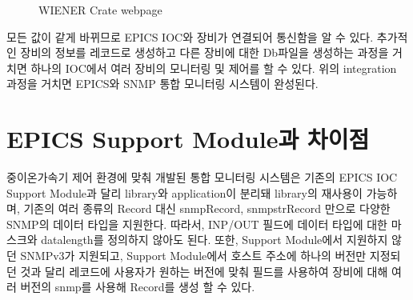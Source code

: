 \documentclass[11pt
  , a4paper
  , article
  , oneside
]{memoir}
\begin{document}
\begin{figure}[!h]
  \centering
              \hfill
              \hfill
  \caption
      {
WIENER Crate webpage
      }
 \label{fig:wienerweb}
\end{figure}

모든 값이 같게 바뀌므로 EPICS IOC와 장비가 연결되어 통신함을 알 수 있다. 추가적인 장비의 정보를 레코드로 생성하고 다른 장비에 대한 Db파일을 생성하는 과정을 거치면 하나의 IOC에서 여러 장비의 모니터링 및 제어를 할 수 있다. 위의 integration 과정을 거치면 EPICS와 SNMP 통합 모니터링 시스템이 완성된다.

\section{EPICS Support Module과 차이점}
중이온가속기 제어 환경에 맞춰 개발된 통합 모니터링 시스템은 기존의 EPICS IOC Support Module과 달리 library와 application이 분리돼 library의 재사용이 가능하며, 기존의 여러 종류의 Record 대신 snmpRecord, snmpstrRecord 만으로 다양한 SNMP의 데이터 타입을 지원한다. 따라서, INP/OUT 필드에 데이터 타입에 대한 마스크와 datalength를 정의하지 않아도 된다. 또한, Support Module에서 지원하지 않던 SNMPv3가 지원되고, Support Module에서 호스트 주소에 하나의 버전만 지정되던 것과 달리 레코드에 사용자가 원하는 버전에 맞춰 필드를 사용하여 장비에 대해 여러 버전의 snmp를 사용해 Record를 생성 할 수 있다.
\end{document}
